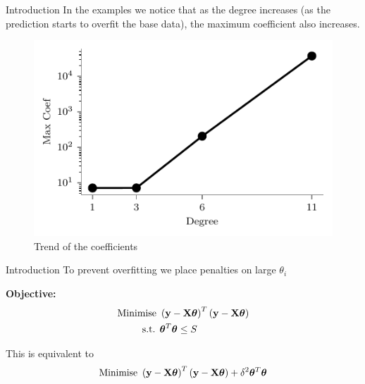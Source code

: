 \documentclass{beamer}
\begin{document}
\begin{frame}{Introduction}
\vspace{0.4cm}
In the examples we notice that as the degree increases (as the prediction starts to overfit the base data), the maximum coefficient also increases.
\begin{figure}\includegraphics[width=0.7\linewidth]{../assets/ridge-regression/figures/lin_plot_coef.pdf}\caption{Trend of the coefficients}\end{figure}

\end{frame}
 
\begin{frame}{Introduction}
\vspace{0.4cm}
To prevent overfitting we place penalties on large $\theta_i$
\pause
 \\ \bigskip
\begin{tcolorbox}
\textbf{Objective:}
\begin{align*}
\text{Minimise } & \left(\mathbf{y}-\mathbf{X}\boldsymbol{\theta}\right)^T\left(\mathbf{y}-\mathbf{X}\boldsymbol{\theta}\right) \\
\text{s.t. } & \boldsymbol{\theta} ^T\boldsymbol{\theta} \leq S
\end{align*}
\end{tcolorbox}
\pause
This is equivalent to \vspace{-0.4cm}
$$
\text{Minimise } \left(\mathbf{y}-\mathbf{X}\boldsymbol{\theta}\right)^T\left(\mathbf{y}-\mathbf{X}\boldsymbol{\theta}\right) + \delta ^2\boldsymbol{\theta} ^T\boldsymbol{\theta}
$$
\end{frame}  
\end{document}
